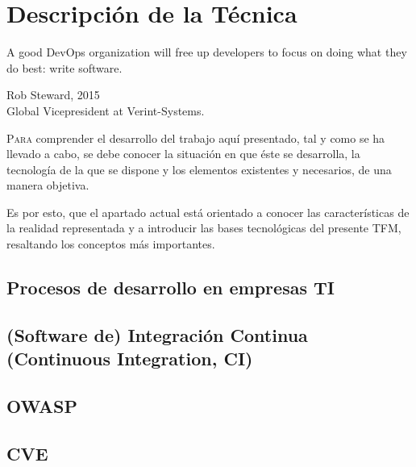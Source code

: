 \chapter{Descripción de la Técnica}\label{chp-02}
\epigraph{A good DevOps organization will free up developers to focus on doing what they do best: write software. }{Rob Steward, 2015\\Global Vicepresident at Verint-Systems.}

\lettrine[lraise=-0.1, lines=2, loversize=0.2]{P}{ara} comprender el desarrollo del trabajo aquí presentado, tal y como se ha llevado a cabo, se debe conocer la situación en que éste se desarrolla, la tecnología de la que se dispone y los elementos existentes y necesarios, de una manera objetiva.

Es por esto, que el apartado actual está orientado a conocer las características de la realidad representada y a introducir las bases tecnológicas del presente \gls{TFM}, resaltando los conceptos más importantes.

\section{Procesos de desarrollo en empresas \gls{TI}}


\section{(Software de) Integración Continua (Continuous Integration, \gls{CI})}

\section{OWASP}


\section{CVE}

